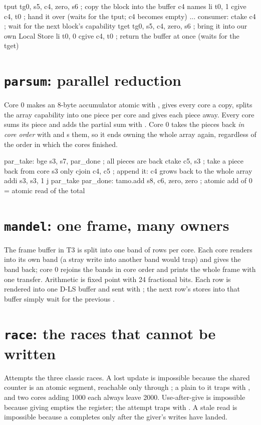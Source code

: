 \begin{asm}
        tput  tg0, s5, c4, zero, s6     ; copy the block into the buffer c4 names
        li    t0, 1
        cgive c4, t0                    ; hand it over (waits for the tput; c4 becomes empty)
        ...
consumer:
        ctake c4                        ; wait for the next block's capability
        tget  tg0, s5, c4, zero, s6     ; bring it into our own Local Store
        li    t0, 0
        cgive c4, t0                    ; return the buffer at once (waits for the tget)
\end{asm}

\section{\texttt{parsum}: parallel reduction}\label{sec:ex-parsum}
Core 0 makes an 8-byte accumulator atomic with , gives every core a copy, splits the array
capability into one piece per core and gives each piece away. Every core sums its piece and adds the
partial sum with . Core 0 takes the pieces back \emph{in core order} with
 and s them, so it ends owning the whole array again, regardless of the
order in which the cores finished.

\begin{asm}
par_take:
        bge   s3, s7, par_done          ; all pieces are back
        ctake c5, s3                    ; take a piece back from core s3 only
        cjoin c4, c5                    ; append it: c4 grows back to the whole array
        addi  s3, s3, 1
        j     par_take
par_done:
        tamo.add s8, c6, zero, zero     ; atomic add of 0 = atomic read of the total
\end{asm}

\section{\texttt{mandel}: one frame, many owners}\label{sec:ex-mandel}
The frame buffer in T3 is split into one band of rows per core. Each core renders into its own band
(a stray write into another band would trap) and gives the band back; core 0 rejoins the bands in core
order and prints the whole frame with one transfer. Arithmetic is fixed point with 24 fractional bits.
Each row is rendered into one D-LS buffer and sent with ; the next row's stores into that
buffer simply wait for the previous .

\section{\texttt{race}: the races that cannot be written}\label{sec:ex-race}
Attempts the three classic races. A lost update is impossible because the shared counter is an atomic
segment, reachable only through ; a plain  to it traps with , and two
cores adding 1000 each always leave 2000. Use-after-give is impossible because giving empties the
register; the attempt traps with . A stale read is impossible because a 
completes only after the giver's writes have landed.

